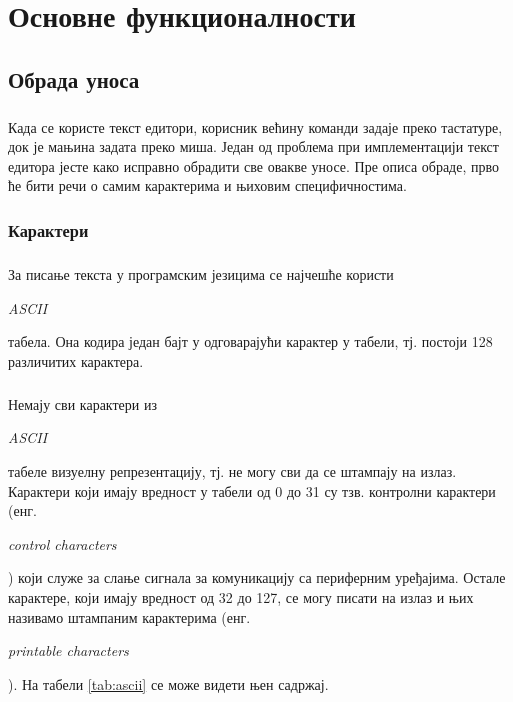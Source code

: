 \documentclass[12pt,oneside]{memoir}
\begin{document}
\chapter{Основне функционалности}
\label{chp:osnovne_funkcionalnosti}

\section{Обрада уноса}
\paragraph{}
Када се користе текст едитори, корисник већину команди задаје преко тастатуре, док је
мањина задата преко миша. Један од проблема при имплементацији текст едитора јесте како
исправно обрадити све овакве уносе. Пре описа обраде, прво ће бити речи о самим
карактерима и њиховим специфичностима. 

\subsection{Карактери}
\paragraph{}
За писање текста у програмским језицима се најчешће користи \begin{latinica}\textit{ASCII}\end{latinica} табела. Она кодира један
бајт у одговарајући карактер у табели, тј. постоји 128 различитих карактера.

\paragraph{}
Немају сви карактери из \begin{latinica}\textit{ASCII}\end{latinica} табеле визуелну
репрезентацију, тј. не могу сви да се штампају на излаз. Карактери који имају вредност
у табели од 0 до 31 су тзв. контролни карактери 
(енг. \begin{latinica}\textit{control characters}\end{latinica}) који служе за
слање сигнала за комуникацију са периферним уређајима. Остале карактере, који
имају вредност од 32 до 127, се могу писати на излаз и њих називамо штампаним
карактерима (енг. \begin{latinica}\textit{printable characters}\end{latinica}).
На табели \ref{tab:ascii} се може видети њен садржај.
\end{document}
